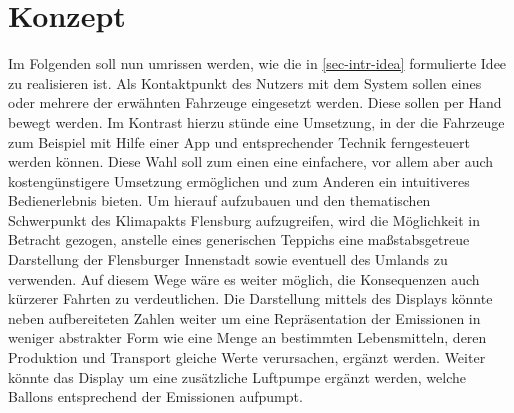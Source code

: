 \documentclass[.../Dokumentation.tex]{subfiles}
\begin{document}
\section{Konzept}\label{sec-concept}
Im Folgenden soll nun umrissen werden, wie die in \ref{sec-intr-idea} 
formulierte Idee zu realisieren ist.
Als Kontaktpunkt des Nutzers mit dem System sollen eines oder mehrere 
der erwähnten Fahrzeuge eingesetzt werden. Diese sollen per Hand bewegt werden. 
Im Kontrast hierzu stünde eine Umsetzung, in der die Fahrzeuge zum Beispiel mit 
Hilfe einer App und entsprechender Technik ferngesteuert werden können.
Diese Wahl soll zum einen eine einfachere, vor allem aber auch kostengünstigere 
Umsetzung ermöglichen und zum Anderen ein intuitiveres Bedienerlebnis bieten.
Um hierauf aufzubauen und den thematischen Schwerpunkt des Klimapakts Flensburg 
aufzugreifen, wird die Möglichkeit in Betracht gezogen, anstelle 
eines generischen Teppichs eine maßstabsgetreue Darstellung der Flensburger 
Innenstadt sowie eventuell des Umlands zu verwenden.
Auf diesem Wege wäre es weiter möglich, die Konsequenzen auch kürzerer Fahrten 
zu verdeutlichen.
Die Darstellung mittels des Displays könnte neben aufbereiteten Zahlen weiter 
um eine Repräsentation der Emissionen in weniger abstrakter Form wie eine 
Menge an bestimmten Lebensmitteln, deren Produktion und Transport gleiche Werte 
verursachen, ergänzt werden.
Weiter könnte das Display um eine zusätzliche Luftpumpe ergänzt werden, 
welche Ballons entsprechend der Emissionen aufpumpt.
\end{document}
